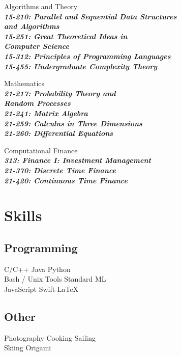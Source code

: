 \documentclass[letterpaper]{deedy-resume}
\begin{document}
\begin{minipage}[t]{0.33\textwidth}
    Algorithms and Theory\\
      \textit{\textbf{\footnotesize {
        \qquad{} 15-210: Parallel and Sequential Data Structures\\
        \qquad{}\qquad{} and Algorithms\\
        \qquad{} 15-251: Great Theoretical Ideas in\\
        \qquad{}\qquad{} Computer Science\\
        \qquad{} 15-312: Principles of Programming Languages\\
        \qquad{} 15-455: Undergraduate Complexity Theory\\
      }}}

    Mathematics\\
      \textit{\textbf{\footnotesize {
        \qquad{} 21-217: Probability Theory and\\
        \qquad{}\qquad{} Random Processes\\
        \qquad{} 21-241: Matrix Algebra\\
        \qquad{} 21-259: Calculus in Three Dimensions\\
        \qquad{} 21-260: Differential Equations\\
      }}}

    Computational Finance\\
      \textit{\textbf{\footnotesize {
        \qquad{} 313: Finance I: Investment Management\\
        \qquad{} 21-370: Discrete Time Finance\\
        \qquad{} 21-420: Continuous Time Finance\\
      }}}

    \sectionspace


    \section{Skills}
      \subsection{Programming}
        C/C++ \textbullet{} Java \textbullet{}  Python \\
        Bash / Unix Tools \textbullet{} Standard ML \\
        JavaScript \textbullet{} Swift \textbullet{} \LaTeX \\

    \sectionspace

      \subsection{Other}
        Photography \textbullet{} Cooking \textbullet{} Sailing\\
        Skiing \textbullet{} Origami\\

  \end{minipage}
\end{document}
